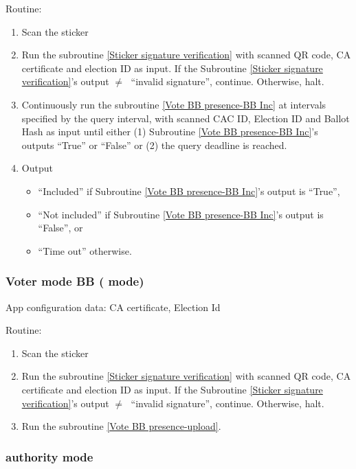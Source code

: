 \documentclass{article}
\begin{document}
Routine:
\begin{enumerate}
    \item Scan the sticker
    \item Run the subroutine \ref{Sticker signature verification} with scanned QR code, CA certificate and election ID as input. If the Subroutine \ref{Sticker signature verification}'s output $\neq\;$ ``invalid signature'', continue. Otherwise, halt.
    \item Continuously run the subroutine \ref{Vote BB presence-BB Inc} at intervals specified by the query interval, with scanned CAC ID, Election ID and Ballot Hash as input until either (1) Subroutine \ref{Vote BB presence-BB Inc}'s outputs ``True'' or ``False'' or (2) the query deadline is reached. 
    \item Output 
    \begin{itemize}
        \item ``Included'' if Subroutine \ref{Vote BB presence-BB Inc}'s output is ``True'',
        \item ``Not included'' if Subroutine \ref{Vote BB presence-BB Inc}'s output is ``False'', or
        \item ``Time out'' otherwise.
    \end{itemize}
    
\end{enumerate}

\subsubsection{Voter mode BB (\StickerBBUpload{}{} mode) }

App configuration data: CA certificate, Election Id


Routine:
\begin{enumerate}
    \item Scan the sticker
    \item Run the subroutine \ref{Sticker signature verification} with scanned QR code, CA certificate and election ID as input. If the Subroutine \ref{Sticker signature verification}'s output $\neq\;$ ``invalid signature'', continue. Otherwise, halt.
    \item Run the subroutine \ref{Vote BB presence-upload}.
\end{enumerate}

\subsubsection{\remoteVotingCenter{} authority mode}
\end{document}
